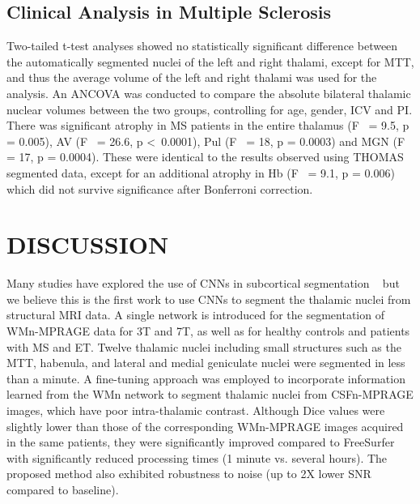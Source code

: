 \documentclass[3p,,final,12pt]{elsarticle}
\begin{document}
\subsection{Clinical Analysis in Multiple Sclerosis}Two-tailed t-test analyses showed no statistically significant difference between the automatically segmented nuclei of the left and right thalami, except for MTT, and thus the average volume of the left and right thalami was used for the analysis. An ANCOVA was conducted to compare the absolute bilateral thalamic nuclear volumes between the two groups, controlling for age, gender, ICV and PI. There was significant atrophy in MS patients in the entire thalamus (F\unskip~\cite{1643371:26789934,1643371:26789933} = 9.5, p = 0.005), AV (F\unskip~\cite{1643371:26789934,1643371:26789933} = 26.6, p \textless\ 0.0001), Pul (F\unskip~\cite{1643371:26789934,1643371:26789933} = 18, p = 0.0003) and MGN (F\unskip~\cite{1643371:26789934,1643371:26789933} = 17, p = 0.0004). These were identical to the results observed using THOMAS segmented data, except for an additional atrophy in Hb (F\unskip~\cite{1643371:26789934,1643371:26789933} = 9.1, p = 0.006) which did not survive significance after Bonferroni correction.
    
\section{DISCUSSION}
Many studies have explored the use of CNNs in subcortical segmentation \unskip~\cite{1643371:26789955,1643371:26789913,1643371:26789947,1643371:26789902} but we believe this is the first work to use CNNs to segment the thalamic nuclei from structural MRI data. A single network is introduced for the segmentation of WMn-MPRAGE data for 3T and 7T, as well as for healthy controls and patients with MS and ET. Twelve thalamic nuclei including small structures such as the MTT, habenula, and lateral and medial geniculate nuclei were segmented in less than a minute. A fine-tuning approach was employed to incorporate information learned from the WMn network to segment thalamic nuclei from CSFn-MPRAGE images, which have poor intra-thalamic contrast. Although Dice values were slightly lower than those of the corresponding WMn-MPRAGE images acquired in the same patients, they were significantly improved compared to FreeSurfer with significantly reduced processing times (1 minute vs. several hours). The proposed method also exhibited robustness to noise (up to 2X lower SNR compared to baseline). 
\end{document}
